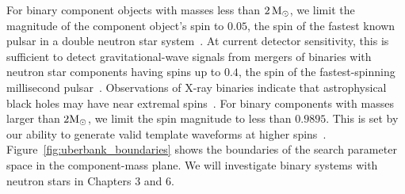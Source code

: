For binary component objects with masses less than $2\,\mathrm{M}_\odot$, we limit the
magnitude of the component object's spin to $0.05$, the spin of the fastest
known pulsar in a double neutron star system~\cite{Burgay:2003jj}. At current
detector sensitivity, this is sufficient to detect gravitational-wave signals
from mergers of binaries with neutron star components having spins up to
$0.4$, the spin of the fastest-spinning millisecond
pulsar~\cite{Lorimer:2008se}.  Observations of X-ray binaries indicate that
astrophysical black holes may have near extremal
spins~\cite{McClintock:2013vwa}. For binary components with masses larger than
$2 \mathrm{M}_\odot$, we limit the spin magnitude to less than $0.9895$.  This is set by
our ability to generate valid template waveforms at higher
spins~\cite{Taracchini:2013rva}.  Figure~\ref{fig:uberbank_boundaries} shows the
boundaries of the search parameter space in the component-mass plane. We will
investigate binary systems with neutron stars in Chapters $3$ and $6$.
 

